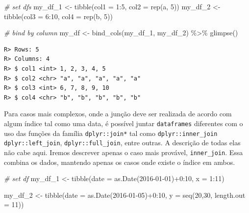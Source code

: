 \documentclass[
  11pt,
]{book}
\newenvironment{Shaded}{\begin{snugshade}}{\end{snugshade}}
\newcommand{\AttributeTok}[1]{\textcolor[rgb]{0.61,0.61,0.61}{#1}}
\newcommand{\CommentTok}[1]{\textcolor[rgb]{0.37,0.37,0.37}{\textit{#1}}}
\newcommand{\DecValTok}[1]{\textcolor[rgb]{0.06,0.06,0.06}{#1}}
\newcommand{\FunctionTok}[1]{\textcolor[rgb]{0,0,0}{#1}}
\newcommand{\NormalTok}[1]{#1}
\newcommand{\OtherTok}[1]{\textcolor[rgb]{0.37,0.37,0.37}{#1}}
\newcommand{\SpecialCharTok}[1]{\textcolor[rgb]{0,0,0}{#1}}
\newcommand{\StringTok}[1]{\textcolor[rgb]{0.5,0.5,0.5}{#1}}
\begin{document}
\begin{Shaded}
\begin{Highlighting}[]
\CommentTok{\# set dfs}
\NormalTok{my\_df\_1 }\OtherTok{\textless{}{-}} \FunctionTok{tibble}\NormalTok{(}\AttributeTok{col1 =} \DecValTok{1}\SpecialCharTok{:}\DecValTok{5}\NormalTok{, }\AttributeTok{col2 =} \FunctionTok{rep}\NormalTok{(}\StringTok{\textquotesingle{}a\textquotesingle{}}\NormalTok{, }\DecValTok{5}\NormalTok{))}
\NormalTok{my\_df\_2 }\OtherTok{\textless{}{-}} \FunctionTok{tibble}\NormalTok{(}\AttributeTok{col3 =} \DecValTok{6}\SpecialCharTok{:}\DecValTok{10}\NormalTok{, }\AttributeTok{col4 =} \FunctionTok{rep}\NormalTok{(}\StringTok{\textquotesingle{}b\textquotesingle{}}\NormalTok{, }\DecValTok{5}\NormalTok{))}

\CommentTok{\# bind by column}
\NormalTok{my\_df }\OtherTok{\textless{}{-}} \FunctionTok{bind\_cols}\NormalTok{(my\_df\_1, my\_df\_2) }\SpecialCharTok{\%\textgreater{}\%}
  \FunctionTok{glimpse}\NormalTok{()}
\end{Highlighting}
\end{Shaded}

\begin{verbatim}
R> Rows: 5
R> Columns: 4
R> $ col1 <int> 1, 2, 3, 4, 5
R> $ col2 <chr> "a", "a", "a", "a", "a"
R> $ col3 <int> 6, 7, 8, 9, 10
R> $ col4 <chr> "b", "b", "b", "b", "b"
\end{verbatim}

Para casos mais complexos, onde a junção deve ser realizada de acordo com algum índice tal como uma data, é possível juntar \texttt{dataframes} diferentes com o uso das funções da família \texttt{dplyr::join*} tal como \texttt{dplyr::inner\_join} \texttt{dplyr::left\_join}, \texttt{dplyr::full\_join}, entre outras. A descrição de todas elas não cabe aqui. Iremos descrever apenas o caso mais provável, \texttt{inner\_join}. Essa combina os dados, mantendo apenas os casos onde existe o índice em ambos.

\begin{Shaded}
\begin{Highlighting}[]
\CommentTok{\# set df}
\NormalTok{my\_df\_1 }\OtherTok{\textless{}{-}} \FunctionTok{tibble}\NormalTok{(}\AttributeTok{date =} \FunctionTok{as.Date}\NormalTok{(}\StringTok{\textquotesingle{}2016{-}01{-}01\textquotesingle{}}\NormalTok{)}\SpecialCharTok{+}\DecValTok{0}\SpecialCharTok{:}\DecValTok{10}\NormalTok{,}
                  \AttributeTok{x =} \DecValTok{1}\SpecialCharTok{:}\DecValTok{11}\NormalTok{)}

\NormalTok{my\_df\_2 }\OtherTok{\textless{}{-}} \FunctionTok{tibble}\NormalTok{(}\AttributeTok{date =} \FunctionTok{as.Date}\NormalTok{(}\StringTok{\textquotesingle{}2016{-}01{-}05\textquotesingle{}}\NormalTok{)}\SpecialCharTok{+}\DecValTok{0}\SpecialCharTok{:}\DecValTok{10}\NormalTok{,}
                  \AttributeTok{y =} \FunctionTok{seq}\NormalTok{(}\DecValTok{20}\NormalTok{,}\DecValTok{30}\NormalTok{, }\AttributeTok{length.out =} \DecValTok{11}\NormalTok{))}
\end{Highlighting}
\end{Shaded}
\end{document}
